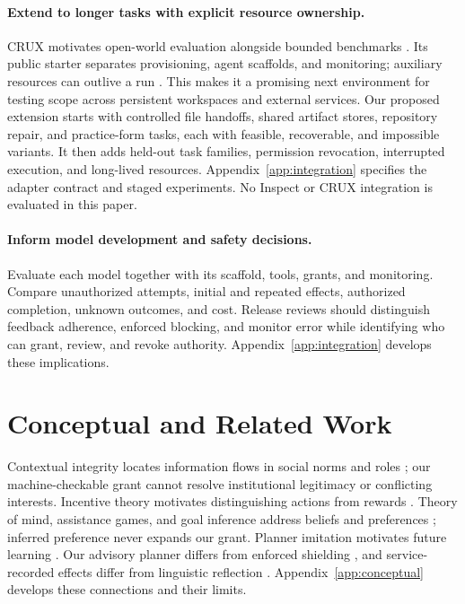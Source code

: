\documentclass[letterpaper]{article}
\begin{document}
\paragraph{Extend to longer tasks with explicit resource ownership.}
CRUX motivates open-world evaluation alongside bounded benchmarks \citep{kapoor2026}. Its public starter separates provisioning, agent scaffolds, and monitoring; auxiliary resources can outlive a run \citep{crux2026}. This makes it a promising next environment for testing scope across persistent workspaces and external services. Our proposed extension starts with controlled file handoffs, shared artifact stores, repository repair, and practice-form tasks, each with feasible, recoverable, and impossible variants. It then adds held-out task families, permission revocation, interrupted execution, and long-lived resources. Appendix~\ref{app:integration} specifies the adapter contract and staged experiments. No Inspect or CRUX integration is evaluated in this paper.

\paragraph{Inform model development and safety decisions.}
Evaluate each model together with its scaffold, tools, grants, and monitoring. Compare unauthorized attempts, initial and repeated effects, authorized completion, unknown outcomes, and cost. Release reviews should distinguish feedback adherence, enforced blocking, and monitor error while identifying who can grant, review, and revoke authority. Appendix~\ref{app:integration} develops these implications.

\section{Conceptual and Related Work}
Contextual integrity locates information flows in social norms and roles \citep{nissenbaum2004}; our machine-checkable grant cannot resolve institutional legitimacy or conflicting interests. Incentive theory motivates distinguishing actions from rewards \citep{holmstrom1979}. Theory of mind, assistance games, and goal inference address beliefs and preferences \citep{premack1978,dennett1987,cirl2016,ma2026,zhou2026}; inferred preference never expands our grant. Planner imitation motivates future learning \citep{mcdonald2022}. Our advisory planner differs from enforced shielding \citep{shielding2017}, and service-recorded effects differ from linguistic reflection \citep{reflexion2023}. Appendix~\ref{app:conceptual} develops these connections and their limits.
\end{document}

